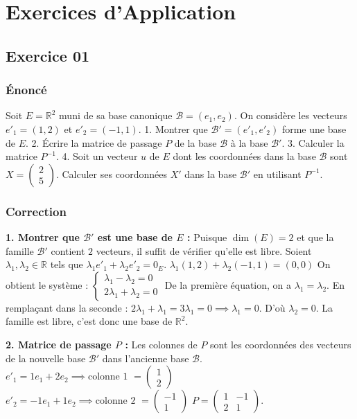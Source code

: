 \documentclass{report}
\begin{document}
\chapter{Exercices d'Application}
\section*{Exercice 01}
\subsection*{Énoncé}
Soit $E = \mathbb{R}^2$ muni de sa base canonique $\mathcal{B} = (e_1, e_2)$.
On considère les vecteurs $e'_1 = (1, 2)$ et $e'_2 = (-1, 1)$.
1. Montrer que $\mathcal{B}' = (e'_1, e'_2)$ forme une base de $E$.
2. Écrire la matrice de passage $P$ de la base $\mathcal{B}$ à la base $\mathcal{B}'$.
3. Calculer la matrice $P^{-1}$.
4. Soit un vecteur $u$ de $E$ dont les coordonnées dans la base $\mathcal{B}$ sont $X = \begin{pmatrix} 2 \\ 5 \end{pmatrix}$.
   Calculer ses coordonnées $X'$ dans la base $\mathcal{B}'$ en utilisant $P^{-1}$.

\subsection*{Correction}
\textbf{1. Montrer que $\mathcal{B}'$ est une base de $E$ :}
Puisque $\dim(E) = 2$ et que la famille $\mathcal{B}'$ contient $2$ vecteurs, il suffit de vérifier qu'elle est libre.
Soient $\lambda_1, \lambda_2 \in \mathbb{R}$ tels que $\lambda_1 e'_1 + \lambda_2 e'_2 = 0_E$.
$\lambda_1(1, 2) + \lambda_2(-1, 1) = (0, 0)$
On obtient le système :
$\begin{cases} \lambda_1 - \lambda_2 = 0 \\ 2\lambda_1 + \lambda_2 = 0 \end{cases}$
De la première équation, on a $\lambda_1 = \lambda_2$.
En remplaçant dans la seconde : $2\lambda_1 + \lambda_1 = 3\lambda_1 = 0 \implies \lambda_1 = 0$.
D'où $\lambda_2 = 0$. La famille est libre, c'est donc une base de $\mathbb{R}^2$.

\textbf{2. Matrice de passage $P$ :}
Les colonnes de $P$ sont les coordonnées des vecteurs de la nouvelle base $\mathcal{B}'$ dans l'ancienne base $\mathcal{B}$.
$e'_1 = 1e_1 + 2e_2 \implies \text{colonne 1 } = \begin{pmatrix} 1 \\ 2 \end{pmatrix}$
$e'_2 = -1e_1 + 1e_2 \implies \text{colonne 2 } = \begin{pmatrix} -1 \\ 1 \end{pmatrix}$
$P = \begin{pmatrix} 1 & -1 \\ 2 & 1 \end{pmatrix}$.
\end{document}

